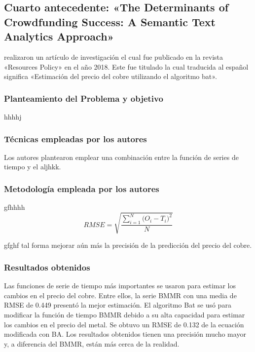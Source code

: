 \subsection{Cuarto antecedente: «The Determinants of Crowdfunding Success: A Semantic Text Analytics Approach» \citep*{pr_yuan2016textanalytics}}
\citeauthor{pr_yuan2016textanalytics} realizaron un artículo de investigación el cual fue publicado en la revista «Resources Policy» en el año 2018. Este fue titulado  la cual traducida al español significa «Estimación del precio del cobre utilizando el algoritmo bat».

\subsubsection{Planteamiento del Problema y objetivo }
hhhhj

\subsubsection{Técnicas empleadas por los autores}
Los autores plantearon emplear una combinación entre la función de series de tiempo y el aljhkk. 

\subsubsection{Metodología empleada por los autores}
gfhhhh
\begin{equation}  
\label{eq:RMSE}
RMSE = \sqrt{\frac{\sum_{i=1}^{N}{\Big(O_i -T_i\Big)^2}}{N}}
\end{equation}

gfghf tal forma mejorar aún más la precisión de la predicción del precio del cobre.

\subsubsection{Resultados obtenidos}
Las funciones de serie de tiempo más importantes se usaron para estimar los cambios en el precio del cobre. Entre ellos, la serie BMMR con una media de RMSE de 0.449 presentó la mejor estimación. El algoritmo Bat  se usó para modificar la función de tiempo BMMR debido a su alta capacidad para estimar los cambios en el precio del metal. Se obtuvo un RMSE de 0.132 de la ecuación modificada con BA. Los resultados obtenidos tienen una precisión mucho mayor y, a diferencia del BMMR, están más cerca de la realidad.


